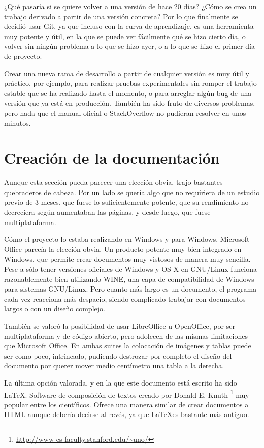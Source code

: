 ¿Qu\'e pasar\'ia si se quiere volver a una versi\'on de hace 20 d\'ias? ¿C\'omo se crea un trabajo derivado a partir
de una versi\'on concreta? Por lo que finalmente se decidi\'o usar Git, ya que incluso con la curva de aprendizaje,
es una herramienta muy potente y \'util, en la que se puede ver f\'acilmente qu\'e se hizo cierto d\'ia, o volver sin 
ning\'un problema a lo que se hizo ayer, o a lo que se hizo el primer d\'ia de proyecto.

Crear una nueva rama de desarrollo a partir de cualquier versi\'on es muy \'util y pr\'actico, por ejemplo, para
realizar pruebas experimentales sin romper el trabajo estable que se ha realizado hasta el 
momento, o para arreglar alg\'un bug de una versi\'on que ya est\'a en producci\'on. 
Tambi\'en ha sido fruto de diversos problemas, pero nada que el manual 
oficial o StackOverflow no pudieran
resolver en unos minutos.

\section{Creaci\'{o}n de la documentaci\'{o}n}
Aunque esta secci\'{o}n pueda parecer una elecci\'{o}n obvia, trajo bastantes quebraderos de cabeza. Por un lado
se quer\'{i}a algo que no requiriera
de un estudio previo de 3 meses, que fuese lo suficientemente potente, que su rendimiento no decreciera seg\'{u}n aumentaban las 
p\'{a}ginas, y desde luego,
que fuese multiplataforma.

C\'{o}mo el proyecto lo estaba realizando en Windows y para Windows, Microsoft Office
parec\'{i}a la elecci\'{o}n obvia. Un 
producto potente muy bien integrado
en Windows, que permite crear documentos muy vistosos de manera muy sencilla. 
Pese a s\'olo tener versiones oficiales de Windows y OS X en GNU/Linux
funciona razonablemente bien utilizando WINE, una capa de compatibilidad
de Windows para sistemas GNU/Linux. 
Pero cuanto m\'as largo es un documento, el programa cada vez reacciona
m\'as despacio, siendo complicado trabajar con documentos largos o con un dise\~no complejo.

Tambi\'en se valor\'o la posibilidad de usar LibreOffice u OpenOffice, por ser 
multiplataforma y de c\'odigo abierto, pero adolecen
de las mismas limitaciones que Microsoft Office. 
En ambas suites la colocaci\'on de im\'agenes y tablas puede ser como poco,
intrincado, pudiendo destrozar por completo el dise\~no del documento por 
querer mover medio cent\'imetro una tabla a la
derecha.

La \'ultima opci\'on valorada, y en la que este documento est\'a escrito ha sido \LaTeX.
Software de composici\'{o}n de textos creado por Donald E. Knuth \footnote{\url{http://www-cs-faculty.stanford.edu/~uno/}} 
muy popular entre los cient\'{i}ficos. Ofrece una manera similar de crear documentos a HTML 
aunque deber\'{i}a decirse al rev\'{e}s, ya que \LaTeX es bastante m\'as antiguo.

